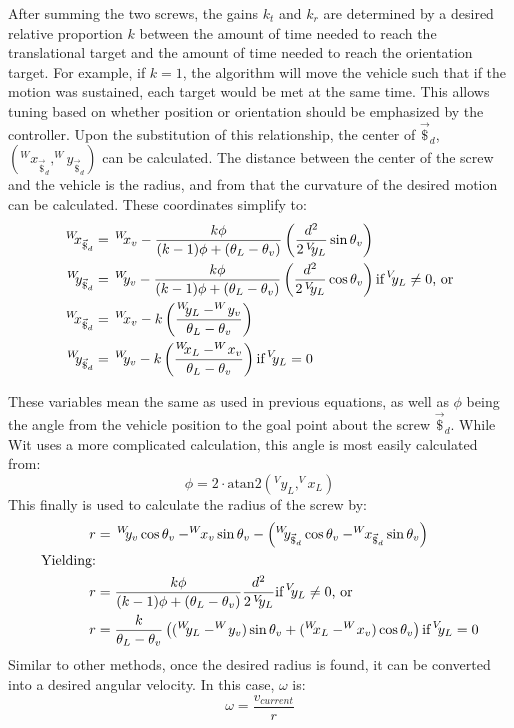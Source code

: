 \documentclass[12pt]{article}
\begin{document}
\begin{flushleft}
After summing the two screws, the gains $k_t$ and $k_r$ are determined by a desired relative proportion $k$ between the amount of time needed to reach the translational target and the amount of time needed to reach the orientation target. For example, if $k=1$, the algorithm will move the vehicle such that if the motion was sustained, each target would be met at the same time. This allows tuning based on whether position or orientation should be emphasized by the controller. Upon the substitution of this relationship, the center of $\vec{\$}_d$, $(^W\!\!x_{\vec{\$}_d}, ^W\!\!y_{\vec{\$}_d})$ can be calculated. The distance between the center of the screw and the vehicle is the radius, and from that the curvature of the desired motion can be calculated. These coordinates simplify to:
\begin{subequations}
\begin{align}
^W\!\!x_{\vec{\$}_d} &=\,^W\!\!x_v - \frac{k\phi}{(k-1)\phi+(\theta_L-\theta_v)} \left( \frac{d^2}{2\,^V\!\!y_L}\sin{\theta_v} \right)\\
^W\!\!y_{\vec{\$}_d} &=\,^W\!\!y_v - \frac{k\phi}{(k-1)\phi+(\theta_L-\theta_v)} \left( \frac{d^2}{2\,^V\!\!y_L}\cos{\theta_v} \right)
\text{if\,}^V\!\!y_L\neq0 \text{, or}\\
^W\!\!x_{\vec{\$}_d} &=\,^W\!\!x_v - k \left( \frac{^W\!\!y_L-^W\!y_v}{\theta_L-\theta_v} \right) \\
^W\!\!y_{\vec{\$}_d} &=\,^W\!\!y_v - k \left( \frac{^W\!\!x_L-^W\!x_v}{\theta_L-\theta_v} \right) 
\text{if\,} ^V\!\!y_L=0
\end{align}
\end{subequations}

These variables mean the same as used in previous equations, as well as $\phi$ being the angle from the vehicle position to the goal point about the screw $\vec{\$}_d$. While Wit uses a more complicated calculation, this angle is most easily calculated from:
\begin{equation}
\phi=2 \cdot \text{atan2}\left(^V\!\!y_L, ^V\!\!x_L\right)
\end{equation}
This finally is used to calculate the radius of the screw by:
\begin{subequations}
\begin{align}
r&= \,^W\!\!y_v\cos{\theta_v}-^W\!\!x_v\sin{\theta_v}-\left(^W\!\!y_{\vec{\$}_d}\cos{\theta_v}-^W\!\!x_{\vec{\$}_d}\sin{\theta_v}\right) \\
\text{Yielding:} &\nonumber \\
r&= \frac{k\phi}{(k-1)\phi+(\theta_L-\theta_v)} \frac{d^2}{2\,^V\!\!y_L} \label{eqn:vp1}
\text{if\,}^V\!\!y_L\neq0 \text{, or}\\
r&= \frac{k}{\theta_L-\theta_v} \left((^W\!\!y_L-^W\!y_v)\sin{\theta_v}+(^W\!\!x_L-^W\!x_v)\cos{\theta_v}\right)
\text{if\,} ^V\!\!y_L=0
\end{align}
\end{subequations}
Similar to other methods, once the desired radius is found, it can be converted into a desired angular velocity. In this case, $\omega$ is:
\begin{equation}
\omega=\frac{v_{current}}{r}
\end{equation}


\end{flushleft}
\end{document}
